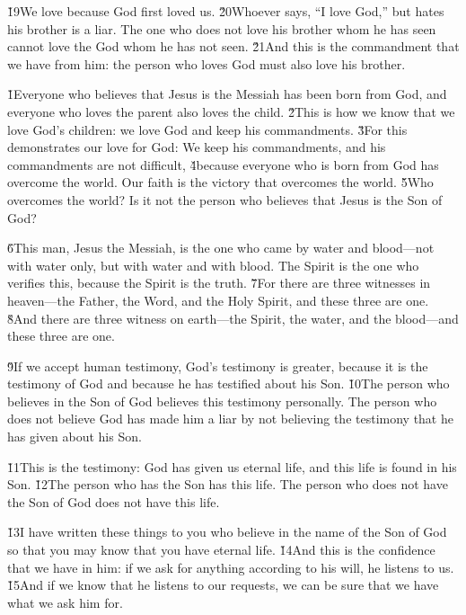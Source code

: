\v{19}We love because God first loved us. \v{20}Whoever says, ``I love God,'' but hates his brother is a liar. The one who does not love his brother whom he has seen cannot love the God whom he has not seen. \v{21}And this is the commandment that we have from him: the person who loves God must also love his brother.

\v{1}Everyone who believes that Jesus is the Messiah has been born from God, and everyone who loves the parent also loves the child. \v{2}This is how we know that we love God's children: we love God and keep his commandments. \v{3}For this demonstrates our love for God: We keep his commandments, and his commandments are not difficult, \v{4}because everyone who is born from God has overcome the world. Our faith is the victory that overcomes the world. \v{5}Who overcomes the world? Is it not the person who believes that Jesus is the Son of God?

\v{6}This man, Jesus the Messiah, is the one who came by water and blood---not with water only, but with water and with blood. The Spirit is the one who verifies this, because the Spirit is the truth. \v{7}For there are three witnesses in heaven---the Father, the Word, and the Holy Spirit, and these three are one. \v{8}And there are three witness on earth---the Spirit, the water, and the blood---and these three are one.

\v{9}If we accept human testimony, God's testimony is greater, because it is the testimony of God and because he has testified about his Son. \v{10}The person who believes in the Son of God believes this testimony personally. The person who does not believe God has made him a liar by not believing the testimony that he has given about his Son.

\v{11}This is the testimony: God has given us eternal life, and this life is found in his Son. \v{12}The person who has the Son has this life. The person who does not have the Son of God does not have this life.

\v{13}I have written these things to you who believe in the name of the Son of God so that you may know that you have eternal life. \v{14}And this is the confidence that we have in him: if we ask for anything according to his will, he listens to us. \v{15}And if we know that he listens to our requests, we can be sure that we have what we ask him for.

